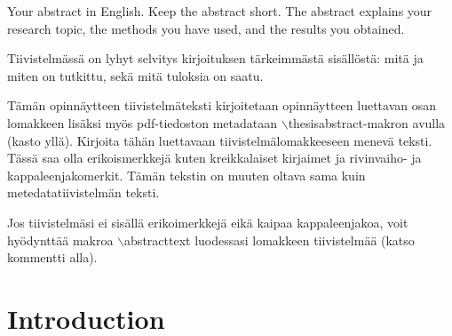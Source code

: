 \documentclass[english, 12pt, a4paper, sci, utf8, a-1b, online]{aaltothesis}
\date{14.10.2020}
\begin{document}
\makecoverpage{}


\makecopyrightpage{}


\begin{abstractpage}[english]
Your abstract in English. Keep the abstract short. The abstract explains your
research topic, the methods you have used, and the results you obtained.
\end{abstractpage}

\newpage



\begin{abstractpage}[finnish]
Tiivistelmässä on lyhyt selvitys kirjoituksen tärkeimmästä sisällöstä: mitä ja
miten on tutkittu, sekä mitä tuloksia on saatu.

Tämän opinnäytteen tiivistelmäteksti kirjoitetaan opinnäytteen luettavan osan 
lomakkeen lisäksi myös pdf-tiedoston metadataan 
$\backslash$thesisabstract-makron avulla (kasto yllä). Kirjoita tähän
luettavaan tiivistelmälomakkeeseen menevä teksti. Tässä saa olla erikoismerkkejä
kuten kreikkalaiset kirjaimet ja rivinvaiho- ja kappaleenjakomerkit. Tämän
tekstin on muuten oltava sama kuin metedatatiivistelmän teksti.

Jos tiivistelmäsi ei sisällä erikoimerkkejä eikä kaipaa kappaleenjakoa, voit
hyödynttää makroa $\backslash$abstracttext luodessasi lomakkeen tiivistelmää
(katso kommentti alla).

\end{abstractpage}

\thesistableofcontents

\cleardoublepage

\section{Introduction}

\end{document}
